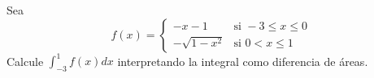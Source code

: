 \item Sea
$$f(x) = \begin{cases} 
-x - 1 & \text{si } -3 \le x \le 0 \\ 
-\sqrt{1 - x^2} & \text{si } 0 < x \le 1 
\end{cases}$$
Calcule $\int_{-3}^1 f(x) dx$ interpretando la integral como diferencia de áreas.
